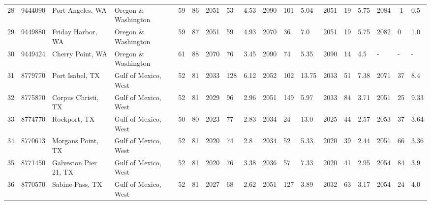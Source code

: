 \begin{longtable}{llllllllllllllllll}
28 &          9444090 &            Port Angeles, WA &      Oregon \& Washington &              59 &       86 &                      2051 &   53 &   4.53 &     2090 &  101 &   5.04 &                          2051 &  19 &  5.75 &     2084 &   -1 &   0.5 \\
29 &          9449880 &           Friday Harbor, WA &      Oregon \& Washington &              59 &       87 &                      2051 &   59 &   4.93 &     2070 &   36 &    7.0 &                          2051 &  19 &  5.75 &     2082 &    0 &   1.0 \\
30 &          9449424 &            Cherry Point, WA &      Oregon \& Washington &              61 &       88 &                      2070 &   76 &   3.45 &     2090 &   74 &   5.35 &                          2090 &  14 &   4.5 &        - &    - &     - \\
31 &          8779770 &             Port Isabel, TX &     Gulf of Mexico, West &              52 &       81 &                      2033 &  128 &   6.12 &     2052 &  102 &  13.75 &                          2033 &  51 &  7.38 &     2071 &   37 &   8.4 \\
32 &          8775870 &          Corpus Christi, TX &     Gulf of Mexico, West &              52 &       81 &                      2029 &   96 &   2.96 &     2051 &  149 &   5.97 &                          2033 &  84 &  3.71 &     2051 &   25 &  9.33 \\
33 &          8774770 &                Rockport, TX &     Gulf of Mexico, West &              50 &       80 &                      2023 &   77 &   2.83 &     2034 &   24 &   13.0 &                          2025 &  44 &  2.57 &     2053 &   37 &  3.64 \\
34 &          8770613 &           Morgans Point, TX &     Gulf of Mexico, West &              52 &       81 &                      2020 &   74 &    2.8 &     2034 &   52 &   5.33 &                          2020 &  39 &  2.44 &     2051 &   66 &  3.36 \\
35 &          8771450 &       Galveston Pier 21, TX &     Gulf of Mexico, West &              52 &       81 &                      2020 &   76 &   3.38 &     2036 &   57 &   7.33 &                          2020 &  41 &  2.95 &     2054 &   84 &   3.9 \\
36 &          8770570 &             Sabine Pass, TX &     Gulf of Mexico, West &              52 &       81 &                      2027 &   68 &   2.62 &     2051 &  127 &   3.89 &                          2032 &  63 &  3.17 &     2054 &   24 &   4.0 \\

\end{longtable}
